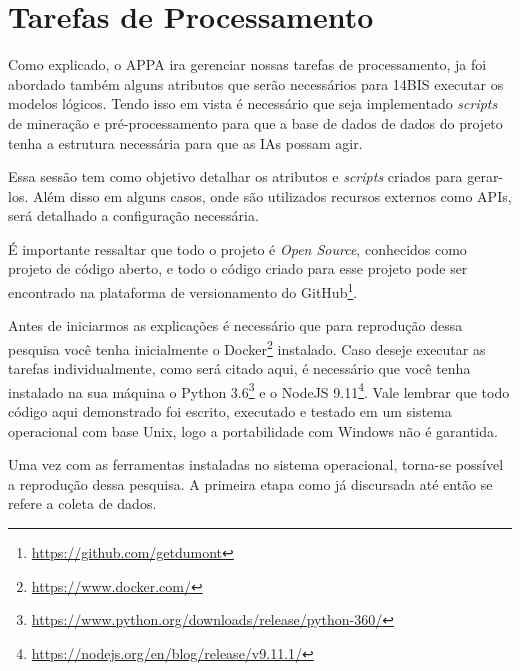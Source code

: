 \section{Tarefas de Processamento}
Como explicado, o APPA ira gerenciar nossas tarefas de processamento, ja foi abordado também alguns atributos que serão necessários para 14BIS executar os modelos lógicos. Tendo isso em vista é necessário que seja implementado \textit{scripts} de mineração e pré-processamento para que a base de dados de dados do projeto tenha a estrutura necessária para que as IAs possam agir.

Essa sessão tem como objetivo detalhar os atributos e \textit{scripts} criados para gerar-los. Além disso em alguns casos, onde são utilizados recursos externos como APIs, será detalhado a configuração necessária.

É importante ressaltar que todo o projeto é \textit{Open Source}, conhecidos como projeto de código aberto, e todo o código criado para esse projeto pode ser encontrado na plataforma de versionamento do GitHub\footnote{\url{https://github.com/getdumont}}.

Antes de iniciarmos as explicações é necessário que para reprodução dessa pesquisa você tenha inicialmente o Docker\footnote{\url{https://www.docker.com/}} instalado. Caso deseje executar as tarefas individualmente, como será citado aqui, é necessário que você tenha instalado na sua máquina o Python 3.6\footnote{\url{https://www.python.org/downloads/release/python-360/}} e o NodeJS 9.11\footnote{\url{https://nodejs.org/en/blog/release/v9.11.1/}}. Vale lembrar que todo código aqui demonstrado foi escrito, executado e testado em um sistema operacional com base Unix, logo a portabilidade com Windows não é garantida.

Uma vez com as ferramentas instaladas no sistema operacional, torna-se possível a reprodução dessa pesquisa. A primeira etapa como já discursada até então se refere a coleta de dados.


